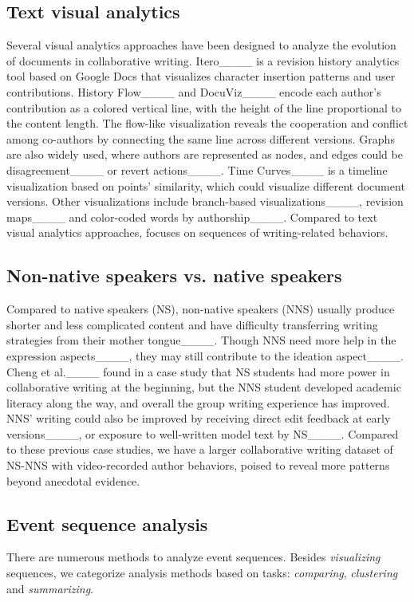 \subsection{Text visual analytics}
Several visual analytics approaches have been designed to analyze the evolution of documents in collaborative writing. Itero____ is a revision history analytics tool based on Google Docs that visualizes character insertion patterns and user contributions. History Flow____ and DocuViz____ encode each author's contribution as a colored vertical line, with the height of the line proportional to the content length. The flow-like visualization reveals the cooperation and conflict among co-authors by connecting the same line across different versions. Graphs are also widely used, where authors are represented as nodes, and edges could be disagreement____ or revert actions____. Time Curves____ is a timeline visualization based on points' similarity, which could visualize different document versions. Other visualizations include branch-based visualizations____, revision maps____ and color-coded words by authorship____.
Compared to text visual analytics approaches, \name{} focuses on sequences of writing-related behaviors.


\subsection{Non-native speakers vs. native speakers}
Compared to native speakers (NS), non-native speakers (NNS) usually produce shorter and less complicated content and have difficulty transferring writing strategies from their mother tongue____. Though NNS need more help in the expression aspects____, they may still contribute to the ideation aspect____. Cheng et al.____ found in a case study that NS students had more power in collaborative writing at the beginning, but the NNS student developed academic literacy along the way, and overall the group writing experience has improved. NNS' writing could also be improved by receiving direct edit feedback at early versions____, or exposure to well-written model text by NS____. Compared to these previous case studies, we have a larger collaborative writing dataset of NS-NNS with video-recorded author behaviors, poised to reveal more patterns beyond anecdotal evidence.

\subsection{Event sequence analysis}
There are numerous methods to analyze event sequences. Besides \textit{visualizing} sequences, we categorize analysis methods based on tasks: \textit{comparing}, \textit{clustering} and \textit{summarizing}.

